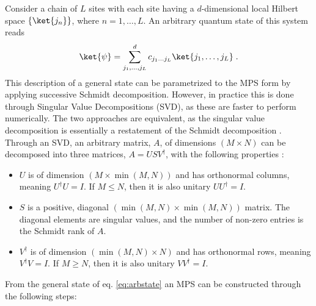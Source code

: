 Consider a chain of $L$ sites with each site having a $d$-dimensional local Hilbert space $\{ \ket{j_n} \}$, where $n = 1, \ldots, L$. An arbitrary quantum state of this system reads
\begin{equation}
	\ket{\psi} = \sum_{j_1, \ldots, j_L}^{d} c_{j_1 \ldots j_L} \ket{j_1, \ldots, j_L} \; .
	\label{eq:arbstate}
\end{equation}
This description of a general state can be parametrized to the MPS form by applying successive Schmidt decomposition. However, in practice this is done through Singular Value Decompositions (SVD), as these are faster to perform numerically. The two approaches are equivalent, as the singular value decomposition is essentially a restatement of the Schmidt decomposition \cite{Pathak2013}.
Through an SVD, an arbitrary matrix, $A$, of dimensions $(M \times N)$ can be decomposed into three matrices, $A = U S V^{\dag}$, with the following properties \cite{schollwock}:
\begin{itemize}
\item
$U$ is of dimension $(M \times \min(M,N))$ and has orthonormal columns, meaning $U^{\dag}U = I$. If $M \leq N$, then it is also unitary $U U^{\dag} = I$.

\item
$S$ is a positive, diagonal $(\min(M,N) \times \min(M,N))$ matrix. The diagonal elements are singular values, and the number of non-zero entries is the Schmidt rank of $A$.

\item
$V^{\dag}$ is of dimension $(\min(M,N) \times N)$ and has orthonormal rows, meaning $V^{\dag}V = I$. If $M \geq N$, then it is also unitary $V V^{\dag} = I$.
\end{itemize} 
From the general state of eq. \eqref{eq:arbstate} an MPS can be constructed through the following steps:
